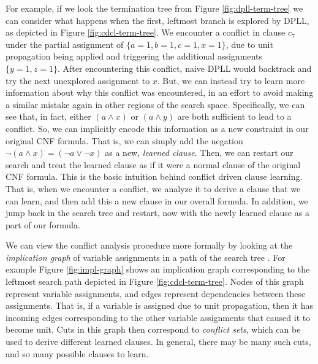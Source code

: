\documentclass[12pt]{article}
\begin{document}
For example, if we look the termination tree from Figure \ref{fig:dpll-term-tree} we can consider what happens when the first, leftmost branch is explored by DPLL, as depicted in Figure \ref{fig:cdcl-term-tree}. We encounter a conflict in clause $c_7$ under the partial assignment of $\{a=1,b=1,c=1,x=1\}$, due to unit propagation being applied and triggering the additional assignments $\{y=1, z=1\}$. After encountering this conflict, naive DPLL would backtrack and try the next unexplored assignment to $x$. But, we can instead try to learn more information about why this conflict was encountered, in an effort to avoid making a similar mistake again in other regions of the search space. Specifically, we can see that, in fact, either $(a \wedge x)$ or $(a \wedge y)$ are both sufficient to lead to a conflict. So, we can implicitly encode this information as a new constraint in our original CNF formula. That is, we can simply add the negation $\neg (a \wedge x) = (\neg a \vee \neg x)$ as a new, \textit{learned clause}. Then, we can restart our search and treat the learned clause as if it were a normal clause of the original CNF formula. This is the basic intuition behind conflict driven clause learning. That is, when we encounter a conflict, we analyze it to derive a clause that we can learn, and then add this a new clause in our overall formula. In addition, we jump back in the search tree and restart, now with the newly learned clause as a part of our formula.

We can view the conflict analysis procedure more formally by looking at the \textit{implication graph} of variable assignments in a path of the search tree \cite{09bieresathandbook}. For example Figure \ref{fig:impl-graph} shows an implication graph corresponding to the leftmost search path depicted in Figure \ref{fig:cdcl-term-tree}. Nodes of this graph represent variable assignments, and edges represent dependencies between these assignments. That is, if a variable is assigned due to unit propagation, then it has incoming edges corresponding to the other variable assignments that caused it to become unit. Cuts in this graph then correspond to \textit{conflict sets}, which can be used to derive different learned clauses. In general, there may be many such cuts, and so many possible clauses to learn.
\end{document}
